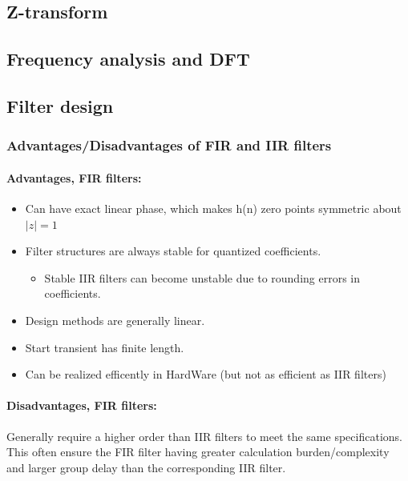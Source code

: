 \documentclass{article}
\begin{document}
\subsection{Z-transform}

\subsection{Frequency analysis and DFT}

\subsection{Filter design}

\subsubsection{Advantages/Disadvantages of FIR and IIR filters}
\paragraph{Advantages, FIR filters:}
\begin{itemize}
    \item Can have exact linear phase, which makes h(n) zero points symmetric about $|z| = 1$
    \item  Filter structures are always stable for quantized coefficients.
    \begin{itemize}
        \item Stable IIR filters can become unstable due to rounding errors in coefficients.
    \end{itemize}
    \item Design methods are generally linear. 
    \item Start transient has finite length.
    \item Can be realized efficently in HardWare (but not as efficient as IIR filters)
\end{itemize}

\paragraph{Disadvantages, FIR filters:}


Generally require a higher order than IIR filters to meet the same specifications. This often ensure the FIR filter having greater calculation burden/complexity and larger group delay than the corresponding IIR filter.
\end{document}
